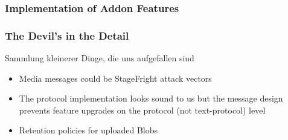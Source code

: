 \documentclass[
	aspectratio=169,
	xetex,
]{beamer}
\newcounter{i}
\begin{document}
\begin{frame}[t]
	\frametitle{Implementation of Addon Features}

		
\end{frame}



\begin{frame}
	\frametitle{The Devil's in the Detail}
	Sammlung kleinerer Dinge, die uns aufgefallen sind
	\begin{itemize}
		\item Media messages could be StageFright attack vectors
		\item The protocol implementation looks sound to us but the message design prevents feature upgrades on the protocol (not text-protocol) level
		\item Retention policies for uploaded Blobs
	\end{itemize}
\end{frame}
\end{document}
